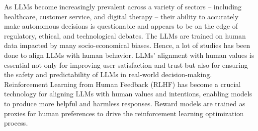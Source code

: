 \documentclass{article}
\begin{document}



As LLMs become increasingly prevalent across a variety of sectors -- including healthcare, customer service, and digital therapy -- their ability to accurately make autonomous decisions is questionable and appears to be on the edge of regulatory, ethical, and technological debates. The LLMs are trained on human data impacted by many socio-economical biases. Hence, a lot of studies has been done to align LLMs with human behavior. LLMs' alignment with human values is essential not only for improving user satisfaction and trust but also for ensuring the safety and predictability of LLMs in real-world decision-making. Reinforcement Learning from Human Feedback (RLHF) has become a crucial technology for aligning LLMs with human values and intentions, enabling models to produce more helpful and harmless responses. Reward models are trained as proxies for human preferences to drive the reinforcement learning optimization process. 
\end{document}
